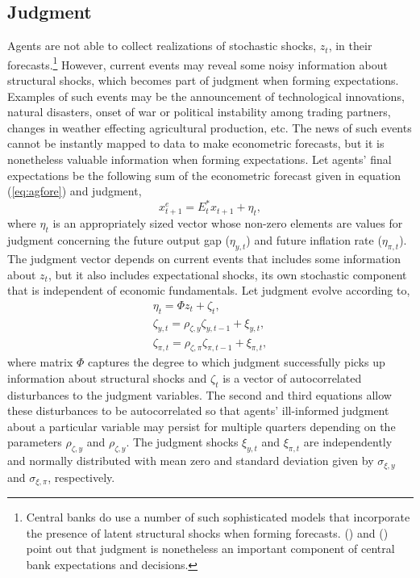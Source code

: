\documentclass[10pt]{article}
\newcommand{\beq}{\begin{equation}}
\newcommand{\eeq}{\end{equation}}
\newcommand{\citee}[1]{\citeauthor*{#1} (\citeyear{#1})}
\newcommand{\ds}{\displaystyle}
\begin{document}
\subsection{Judgment}
Agents are not able to collect realizations of stochastic shocks, $z_t$, in their forecasts.\footnote{Central banks do use a number of such sophisticated models that incorporate the presence of latent structural shocks when forming forecasts.  \citee{rsw1997} and \citee{svensson2005} point out that judgment is nonetheless an important component of central bank expectations and decisions.}  However, current events may reveal some noisy information about structural shocks, which becomes part of judgment when forming expectations.  Examples of such events may be the announcement of technological innovations, natural disasters, onset of war or political instability among trading partners, changes in weather effecting agricultural production, etc.  The news of such events cannot be instantly mapped to data to make econometric forecasts, but it is nonetheless valuable information when forming expectations.  Let agents' final expectations be the following sum of the econometric forecast given in equation (\ref{eq:agfore}) and judgment,
\beq x_{t+1}^e = E_t^* x_{t+1} + \eta_{t}, \eeq
where $\eta_t$ is an appropriately sized vector whose non-zero elements are values for judgment concerning the future output gap ($\eta_{y,t}$) and future inflation rate ($\eta_{\pi,t}$).  The judgment vector depends on current events that includes some information about $z_t$, but it also includes expectational shocks, its own stochastic component that is independent of economic fundamentals.  Let judgment evolve according to,
\beq \label{eq:news} \begin{array}{c} \ds \eta_t = \Phi z_t + \zeta_t, \\ [1pc]
 \ds \zeta_{y,t} = \rho_{\zeta,y} \zeta_{y,t-1} + \xi_{y,t}, \\ [1pc]
 \ds \zeta_{\pi,t} = \rho_{\zeta,\pi} \zeta_{\pi,t-1} + \xi_{\pi,t},
\end{array} \eeq
where matrix $\Phi$ captures the degree to which judgment successfully picks up information about structural shocks and $\zeta_t$ is a vector of autocorrelated disturbances to the judgment variables.  The second and third equations allow these disturbances to be autocorrelated so that agents' ill-informed judgment about a particular variable may persist for multiple quarters depending on the parameters $\rho_{\zeta,y}$ and $\rho_{\zeta,y}$.  The judgment shocks $\xi_{y,t}$ and $\xi_{\pi,t}$ are independently and normally distributed with mean zero and standard deviation given by $\sigma_{\xi,y}$ and $\sigma_{\xi,\pi}$, respectively.  
\end{document}
